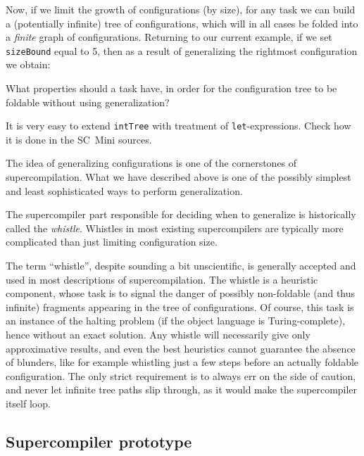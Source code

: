Now, if we limit the growth of configurations (by size),
for any task we can build a (potentially infinite) tree of configurations,
which will in all cases be folded into a \emph{finite} graph of configurations.
Returning to our current example, if we set \texttt{sizeBound} equal to 5, then as
a result of generalizing the rightmost configuration we obtain:\\


\begin{exercise} 
What properties should a task have, in order for the configuration
tree to be foldable without using generalization?
\end{exercise}

\begin{exercise}
It is very easy to extend \texttt{intTree} with treatment of \texttt{let}-expressions.
Check how it is done in the SC~Mini sources.
\end{exercise}

The idea of generalizing configurations is one of the cornerstones of supercompilation.
What we have described above is one of the possibly simplest and 
least sophisticated ways to perform generalization.

The supercompiler part responsible for deciding when to generalize is
historically called the \emph{whistle}.
Whistles in most existing supercompilers are typically more complicated
than just limiting configuration size.

The term ``whistle'', despite sounding a bit unscientific, is generally accepted
and used in most descriptions of supercompilation.
The whistle is a heuristic component, whose task is to signal the danger of
possibly non-foldable (and thus infinite) fragments appearing in the tree of configurations.
Of course, this task is an instance of the halting problem
(if the object language is Turing-complete), hence without an exact solution.
Any whistle will necessarily give only approximative results, and even the
best heuristics cannot guarantee the absence of blunders, like for example
whistling just a few steps before an actually foldable configuration.
The only strict requirement is to always err on the side of caution,
and never let infinite tree paths slip through, as it would make
the supercompiler itself loop.

\subsection{Supercompiler prototype}


